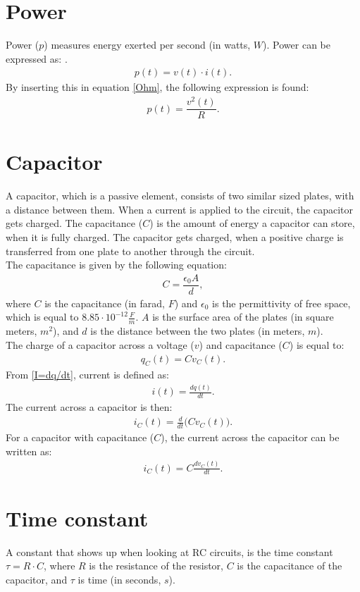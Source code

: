 \section{Power} 
Power ($p$) measures energy exerted per second (in watts, $W$). Power can be expressed as: \cite[p. 22]{bcircuit5}.
\begin{align} 
\label{power}
p(t)=v(t)\cdot i(t).
\end{align}
By inserting this in equation \eqref{Ohm}, the following expression is found:
\begin{align}
p(t)=\dfrac{v^2(t)}{R}. \label{resistor:power}
\end{align}

\section{Capacitor}
A capacitor, which is a passive element, consists of two similar sized plates, with a distance between them. When a current is applied to the circuit, the capacitor gets charged. The capacitance ($C$) is the amount of energy a capacitor can store, when it is fully charged. The capacitor gets charged, when a positive charge is transferred from one plate to another through the circuit.
\\
The capacitance is given by the following equation:
\begin{align*}
C=\dfrac{\epsilon_{0}A}{d},
\end{align*}
where $C$ is the capacitance (in farad, $F$) and $\epsilon_{0}$ is the permittivity of free space, which is equal to $8.85 \cdot 10^{-12}                                                 \frac{F}{m}$. $A$ is the surface area of the plates (in square meters, $m^{2}$), and $d$ is the distance between the two plates (in meters, $m$).
\\
The charge of a capacitor across a voltage ($v$) and capacitance ($C$) is equal to: \cite[p.~253]{bcircuit5}
\begin{align}
\label{QCV}
q_C(t) = Cv_C(t).	
\end{align}
From \eqref{I=dq/dt}, current is defined as:
\begin{align*}
	i(t) = \frac{dq(t)}{dt}.
\end{align*}
The current across a capacitor is then:
\begin{align*}
	i_C(t) = \frac{d}{dt}\big(Cv_C(t)\big).
\end{align*}
For a capacitor with capacitance ($C$), the current across the capacitor can be written as:
\begin{align}
	i_C(t) = C\frac{dv_C(t)}{dt}.\label{iC}
\end{align}
\section{Time constant}
A constant that shows up when looking at RC circuits, is the time constant $\tau = R \cdot C$, where $R$ is the resistance of the resistor, $C$ is the capacitance of the capacitor, and $\tau$ is time (in seconds, $s$).

